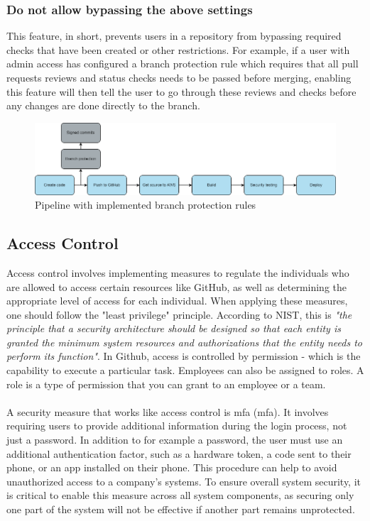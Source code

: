 \subsubsection{Do not allow bypassing the above settings}
This feature, in short, prevents users in a repository from bypassing required checks that have been created or other restrictions. For example, if a user with admin access has configured a branch protection rule which requires that all pull requests reviews and status checks needs to be passed before merging, enabling this feature will then tell the user to go through these reviews and checks before any changes are done directly to the branch. 

\vspace{2mm}
\begin{figure}[H]
    \centering
    \includegraphics[width=0.8\columnwidth]{Images/pipeline6.png}
    \caption{Pipeline with implemented branch protection rules}
    \label{fig: Pipeline with implemented branch protection rules}
\end{figure}

\subsection{Access Control}
Access control involves implementing measures to regulate the individuals who are allowed to access certain resources like GitHub, as well as determining the appropriate level of access for each individual. When applying these measures, one should follow the "least privilege" principle. According to NIST, this is \textit{"the principle that a security architecture should be designed so that each entity is granted the minimum system resources and authorizations that the entity needs to perform its function"}\cite{leastprivilege}. In Github, access is controlled by permission - which is the capability to execute a particular task. Employees can also be assigned to roles. A role is a type of permission that you can grant to an employee or a team. \cite{accesscontroll}
\\~\\
A security measure that works like access control is \acrlong{mfa} (\acrshort{mfa}). It involves requiring users to provide additional information during the login process, not just a password. In addition to for example a password, the user must use an additional authentication factor, such as a hardware token, a code sent to their phone, or an app installed on their phone.
This procedure can help to avoid unauthorized access to a company's systems. To ensure overall system security, it is critical to enable this measure across all system components, as securing only one part of the system will not be effective if another part remains unprotected. \cite{MFA}

